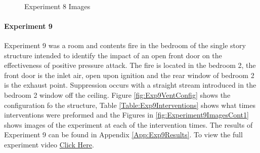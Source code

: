 \documentclass{article}
\begin{document}
\begin{figure}[H]
	\ContinuedFloat 
	\centering 
	 \ 
	\caption{Experiment 8 Images}
	\label{fig:Experiment8ImagesCont3} 
\end{figure}

\paragraph{Experiment 9}\mbox{}

Experiment 9 was a room and contents fire in the bedroom of the single story structure intended to identify the impact of an open front door on the effectiveness of positive pressure attack. The fire is located in the bedroom 2, the front door is the inlet air, open upon ignition and the rear window of bedroom 2 is the exhaust point. Suppression occurs with a straight stream introduced in the bedroom 2 window off the ceiling. Figure \ref{fig:Exp9VentConfig} shows the configuration fo the structure, Table \ref{Table:Exp9Interventions} shows what times interventions were preformed and the Figures in \ref{fig:Experiment9ImagesCont1} shows images of the experiment at each of the intervention times. The results of Experiment 9 can be found in Appendix \ref{App:Exp9Results}. To view the full experiment video \href{https://youtu.be/_t64OLbhjks}{Click Here}.
\end{document}
